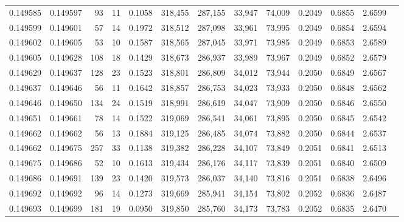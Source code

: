 \begin{tabular}{rrrrrrrrrrrrr}
0.149585 & 0.149597 &    93 &  11 &                                     0.1058 & 318,455 & 287,155 &  33,947 &  74,009 & 0.2049 & 0.6855 & 2.6599 \\
0.149599 & 0.149601 &    57 &  14 &                                     0.1972 & 318,512 & 287,098 &  33,961 &  73,995 & 0.2049 & 0.6854 & 2.6594 \\
0.149602 & 0.149605 &    53 &  10 &                                     0.1587 & 318,565 & 287,045 &  33,971 &  73,985 & 0.2049 & 0.6853 & 2.6589 \\
0.149605 & 0.149628 &   108 &  18 &                                     0.1429 & 318,673 & 286,937 &  33,989 &  73,967 & 0.2049 & 0.6852 & 2.6579 \\
0.149629 & 0.149637 &   128 &  23 &                                     0.1523 & 318,801 & 286,809 &  34,012 &  73,944 & 0.2050 & 0.6849 & 2.6567 \\
0.149637 & 0.149646 &    56 &  11 &                                     0.1642 & 318,857 & 286,753 &  34,023 &  73,933 & 0.2050 & 0.6848 & 2.6562 \\
0.149646 & 0.149650 &   134 &  24 &                                     0.1519 & 318,991 & 286,619 &  34,047 &  73,909 & 0.2050 & 0.6846 & 2.6550 \\
0.149651 & 0.149661 &    78 &  14 &                                     0.1522 & 319,069 & 286,541 &  34,061 &  73,895 & 0.2050 & 0.6845 & 2.6542 \\
0.149662 & 0.149662 &    56 &  13 &                                     0.1884 & 319,125 & 286,485 &  34,074 &  73,882 & 0.2050 & 0.6844 & 2.6537 \\
0.149662 & 0.149675 &   257 &  33 &                                     0.1138 & 319,382 & 286,228 &  34,107 &  73,849 & 0.2051 & 0.6841 & 2.6513 \\
0.149675 & 0.149686 &    52 &  10 &                                     0.1613 & 319,434 & 286,176 &  34,117 &  73,839 & 0.2051 & 0.6840 & 2.6509 \\
0.149686 & 0.149691 &   139 &  23 &                                     0.1420 & 319,573 & 286,037 &  34,140 &  73,816 & 0.2051 & 0.6838 & 2.6496 \\
0.149692 & 0.149692 &    96 &  14 &                                     0.1273 & 319,669 & 285,941 &  34,154 &  73,802 & 0.2052 & 0.6836 & 2.6487 \\
0.149693 & 0.149699 &   181 &  19 &                                     0.0950 & 319,850 & 285,760 &  34,173 &  73,783 & 0.2052 & 0.6835 & 2.6470 \\

\end{tabular}

